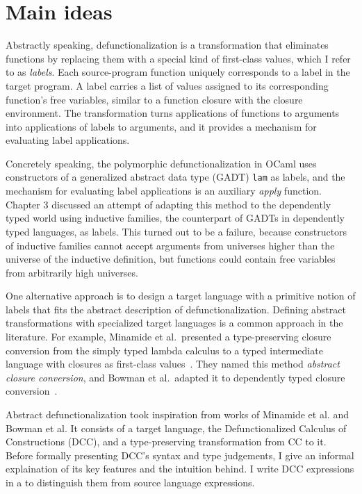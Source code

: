 
\section{Main ideas}

Abstractly speaking, defunctionalization is a transformation that eliminates functions by replacing them with a special kind of first-class values, which I refer to as \textit{labels}. Each source-program function uniquely corresponds to a label in the target program. 
A label carries a list of values assigned to its corresponding function's free variables, similar to a function closure with the closure environment. 
The transformation turns applications of functions to arguments into applications of labels to arguments, and it provides a mechanism for evaluating label applications.

Concretely speaking, the polymorphic defunctionalization in OCaml uses constructors of a generalized abstract data type (GADT) \texttt{lam} as labels, and the mechanism for evaluating label applications is an auxiliary \textit{apply} function. Chapter 3 discussed an attempt of adapting this method to the dependently typed world using inductive families, the counterpart of GADTs in dependently typed languages, as labels. 
This turned out to be a failure, because constructors of inductive families cannot accept arguments from universes higher than the universe of the inductive definition, but functions could contain free variables from arbitrarily high universes.

One alternative approach is to design a target language with a primitive notion of labels that fits the abstract description of defunctionalization. Defining abstract transformations with specialized target languages is a common approach in the literature. For example, Minamide et al.~presented a type-preserving closure conversion from the simply typed lambda calculus to a typed intermediate language with closures as first-class values~\cite{DBLP:conf/popl/MinamideMH96}. They named this method \textit{abstract closure conversion}, and Bowman et al.~adapted it to dependently typed closure conversion~\cite{DBLP:conf/pldi/BowmanA18}. 

Abstract defunctionalization took inspiration from works of Minamide et al. and Bowman et al. It consists of a target language, the Defunctionalized Calculus of Constructions (DCC), and a type-preserving transformation from CC to it. 
Before formally presenting DCC's syntax and type judgements, I give an informal explaination of its key features and the intuition behind. I write DCC expressions in a  \color{black} to distinguish them from source language expressions.

